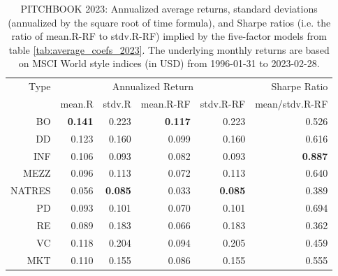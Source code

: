 \documentclass[12pt]{article}
\begin{document}
\begin{table}[ht]
	\centering
	\begin{tabular}{rrrrrr}
		Type & \multicolumn{4}{c}{Annualized Return} & Sharpe Ratio \\ 
		\cmidrule(r){2-5}
		& mean.R & stdv.R & mean.R-RF & stdv.R-RF & mean/stdv.R-RF \\ 
		\hline
		\hline
		BO & \textbf{0.141} & 0.223 & \textbf{0.117} & 0.223 & 0.526 \\ 
		DD & 0.123 & 0.160 & 0.099 & 0.160 & 0.616 \\ 
		INF & 0.106 & 0.093 & 0.082 & 0.093 & \textbf{0.887} \\ 
		MEZZ & 0.096 & 0.113 & 0.072 & 0.113 & 0.640 \\ 
		NATRES & 0.056 & \textbf{0.085} & 0.033 & \textbf{0.085} & 0.389 \\ 
		PD & 0.093 & 0.101 & 0.070 & 0.101 & 0.694 \\ 
		RE & 0.089 & 0.183 & 0.066 & 0.183 & 0.362 \\ 
		VC & 0.118 & 0.204 & 0.094 & 0.205 & 0.459 \\ 
			\hline
		MKT & 0.110 & 0.155 & 0.086 & 0.155 & 0.555 \\ 
		\hline
		\hline
	\end{tabular}
	\caption{
		PITCHBOOK 2023: 
		Annualized average returns, standard deviations (annualized by the square root of time formula), and Sharpe ratios (i.e. the ratio of mean.R-RF to stdv.R-RF) implied by the five-factor models from table \ref{tab:average_coefs_2023}.
	The underlying monthly returns are based on MSCI World style indices (in USD) from 1996-01-31 to 2023-02-28.} 
	\label{tab:ann_returns_2023}
\end{table}
\end{document}

